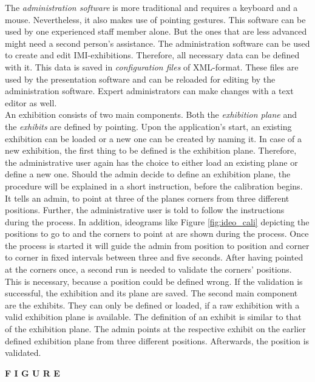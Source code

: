 The \textit{administration software} is more traditional and requires a keyboard and a mouse. Nevertheless, it also makes use of pointing gestures. This software can be used by one experienced staff member alone. But the ones that are less advanced might need a second person's assistance. The administration software can be used to create and edit \ac{IMI}-exhibitions. Therefore, all necessary data can be defined with it. This data is saved in \textit{configuration files} of XML-format. These files are used by the presentation software and can be reloaded for editing by the administration software. Expert administrators can make changes with a text editor as well. 
\\
An exhibition consists of two main components. Both the \textit{exhibition plane} and the \textit{exhibits} are defined by pointing. Upon the application's start, an existing exhibition can be loaded or a new one can be created by naming it. In case of a new exhibition, the first thing to be defined is the exhibition plane. Therefore, the administrative user again has the choice to either load an existing plane or define a new one. Should the admin decide to define an exhibition plane, the procedure will be explained in a short instruction, before the calibration begins. It tells an admin, to point at three of the planes corners from three different positions. Further, the administrative user is told to follow the instructions during the process. In addition, ideograms like Figure \ref{fig:ideo_cali} depicting the positions to go to and the corners to point at are shown during the process. Once the process is started it will guide the admin from position to position and corner to corner in fixed intervals between three and five seconds. After having pointed at the corners once, a second run is needed to validate the corners' positions. This is necessary, because a position could be defined wrong. If the validation is successful, the exhibition and its plane are saved. The second main component are the exhibits. They can only be defined or loaded, if a raw exhibition with a valid exhibition plane is available. The definition of an exhibit is similar to that of the exhibition plane. The admin points at the respective exhibit on the earlier defined exhibition plane from three different positions. Afterwards, the position is validated.

\textbf{F I G U R E}

